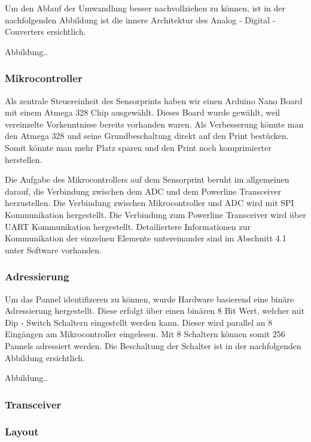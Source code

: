 Um den Ablauf der Umwandlung besser nachvollziehen zu können, ist in der nachfolgenden Abbildung ist die innere Architektur des Analog - Digital - Converters ersichtlich.

Abbildung..

\subsubsection{Mikrocontroller}
Als zentrale Steuereinheit des Sensorprints haben wir einen Arduino Nano Board mit einem Atmega 328 Chip ausgewählt. Dieses Board wurde gewählt, weil vereinzelte Vorkenntnisse bereits vorhanden waren. Als Verbesserung könnte man den Atmega 328 und seine Grundbeschaltung direkt auf den Print bestücken. Somit könnte man mehr Platz sparen und den Print noch komprimierter herstellen.

Die Aufgabe des Mikrocontrollers auf dem Sensorprint beruht im allgemeinen darauf, die Verbindung zwischen dem ADC und dem Powerline Transceiver herzustellen. Die Verbindung zwischen Mikrocontroller und ADC wird mit SPI Kommunikation hergestellt. Die Verbindung zum Powerline Transceiver wird über UART Kommunikation hergestellt. Detailiertere Informationen zur Kommunikation der einzelnen Elemente untereinander sind im Abschnitt 4.1 unter Software vorhanden.

\subsubsection{Adressierung}
Um das Pannel identifizeren zu können, wurde Hardware basierend eine binäre Adressierung hergestellt. Diese erfolgt über einen binären 8 Bit Wert, welcher mit Dip - Switch Schaltern eingestellt werden kann. Dieser wird parallel an 8 Eingängen am Mikrocontroller eingelesen. Mit 8 Schaltern können somit 256 Pannels adressiert werden. Die Beschaltung der Schalter ist in der nachfolgenden Abbildung ersichtlich.

Abbildung..

\subsubsection{Transceiver}
\subsubsection{Layout}


